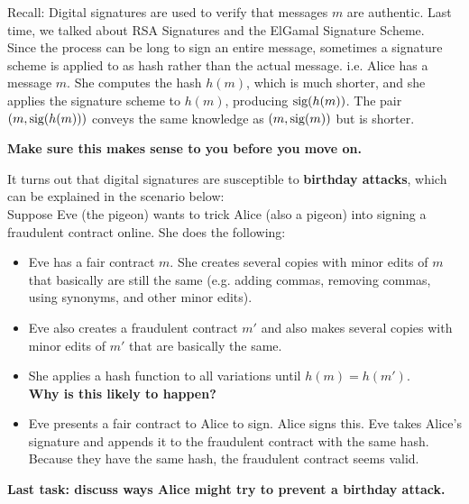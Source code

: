 \documentclass[12pt]{amsart}
\theoremstyle{plain}
\theoremstyle{definition}
\theoremstyle{remark}
\begin{document}
\begin{framed}
\noindent Recall: Digital signatures are used to verify that messages $m$ are authentic.  Last time, we talked about RSA Signatures and the ElGamal Signature Scheme.\\

Since the process can be long to sign an entire message, sometimes a signature scheme is applied to as hash rather than the actual message.  i.e. Alice has a message $m$.  She computes the hash $h(m)$, which is much shorter, and she applies the signature scheme to $h(m)$, producing $\textup{sig}(h(m))$.  The pair $(m, \textup{sig}(h(m)))$ conveys the same knowledge as $(m, \textup{sig}(m))$ but is shorter.
\end{framed}

\begin{center}
\textbf{Make sure this makes sense to you before you move on.}
\end{center}

It turns out that digital signatures are susceptible to \textbf{birthday attacks}, which can be explained in the scenario below:\\

Suppose Eve (the pigeon) wants to trick Alice (also a pigeon) into signing a fraudulent contract online.  She does the following:\\
\begin{itemize}
	\item Eve has a fair contract $m$.  She creates several copies with minor edits of $m$ that basically are still the same (e.g. adding commas, removing commas, using synonyms, and other minor edits).
	\item Eve also creates a fraudulent contract $m'$ and also makes several copies with minor edits of $m'$ that are basically the same.
	\item She applies a hash function to all variations until $h(m) = h(m')$.\\  \textbf{Why is this likely to happen?}
	\item Eve presents a fair contract to Alice to sign.  Alice signs this.  Eve takes Alice's signature and appends it to the fraudulent contract with the same hash.  Because they have the same hash, the fraudulent contract seems valid.\\ \vspace{2in}
\end{itemize}

\begin{center}
\textbf{Last task: discuss ways Alice might try to prevent a birthday attack.}
\end{center}
\end{document}
